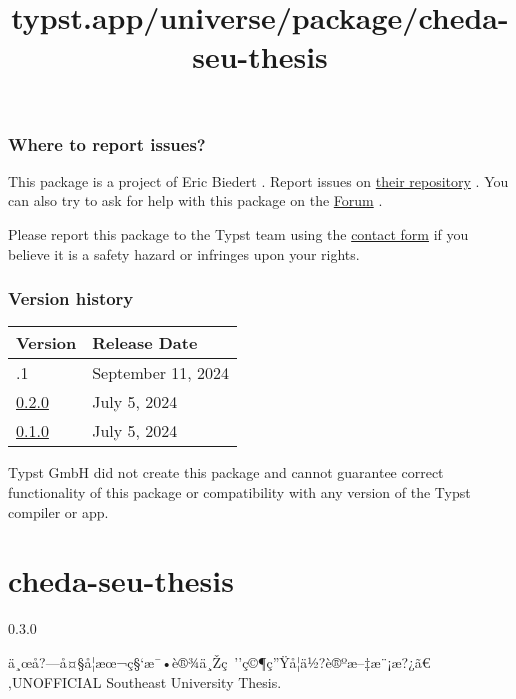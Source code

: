 \subsubsection{Where to report issues?}\label{where-to-report-issues}

This package is a project of Eric Biedert . Report issues on
\href{https://github.com/EpicEricEE/typst-equate}{their repository} .
You can also try to ask for help with this package on the
\href{https://forum.typst.app}{Forum} .

Please report this package to the Typst team using the
\href{https://typst.app/contact}{contact form} if you believe it is a
safety hazard or infringes upon your rights.

\label{versions}
\subsubsection{Version history}\label{version-history}

\begin{longtable}[]{@{}ll@{}}
\toprule\noalign{}
Version & Release Date \\
\midrule\noalign{}
\endhead
\bottomrule\noalign{}
\endlastfoot
0.2.1 & September 11, 2024 \\
\href{https://typst.app/universe/package/equate/0.2.0/}{0.2.0} & July 5,
2024 \\
\href{https://typst.app/universe/package/equate/0.1.0/}{0.1.0} & July 5,
2024 \\
\end{longtable}

Typst GmbH did not create this package and cannot guarantee correct
functionality of this package or compatibility with any version of the
Typst compiler or app.


\title{typst.app/universe/package/cheda-seu-thesis}

\label{banner}
\label{template-thumbnail}

\section{cheda-seu-thesis}\label{cheda-seu-thesis}

{ 0.3.0 }

ä¸œå?---å¤§å­¦æœ¬ç§`æ¯•è®¾ä¸Žç~''ç©¶ç''Ÿå­¦ä½?è®ºæ--‡æ¨¡æ?¿ã€‚UNOFFICIAL
Southeast University Thesis.

